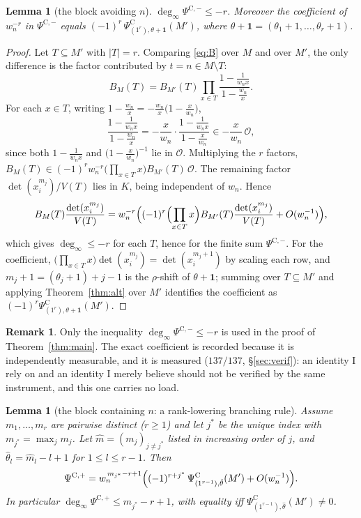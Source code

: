 \documentclass[11pt]{article}
\newtheorem{lemma}[theorem]{Lemma}
\theoremstyle{definition}
\newtheorem{remark}[theorem]{Remark}
\newcommand{\PsiC}{\Psi^{\mathrm{C}}}
\newcommand{\PsiCs}[1]{\Psi^{\mathrm{C},#1}}
\newcommand{\bone}{\mathbf{1}}
\newcommand{\degi}{\deg_{\infty}}
\begin{document}
\begin{lemma}[the block avoiding $n$]\label{lem:blockB}
$\degi\PsiCs{-}\le-r$. Moreover the coefficient of $w_n^{-r}$ in $\PsiCs{-}$ equals
$(-1)^r\,\PsiC_{(1^r),\theta+\bone}(M')$, where $\theta+\bone=(\theta_1+1,\dots,\theta_r+1)$.
\end{lemma}

\begin{proof}
Let $T\subseteq M'$ with $|T|=r$. Comparing \eqref{eq:B} over $M$ and over $M'$, the only
difference is the factor contributed by $t=n\in M\setminus T$:
\[
  B_M(T)=B_{M'}(T)\prod_{x\in T}\frac{1-\frac{1}{w_nx}}{1-\frac{w_n}{x}} .
\]
For each $x\in T$, writing $1-\frac{w_n}{x}=-\frac{w_n}{x}\bigl(1-\frac{x}{w_n}\bigr)$,
\[
  \frac{1-\frac{1}{w_nx}}{1-\frac{w_n}{x}}
  = -\frac{x}{w_n}\cdot\frac{1-\frac{1}{w_nx}}{1-\frac{x}{w_n}}
  \in -\frac{x}{w_n}\,\mathcal{O},
\]
since both $1-\frac{1}{w_nx}$ and $\bigl(1-\frac{x}{w_n}\bigr)^{-1}$ lie in $\mathcal{O}$.
Multiplying the $r$ factors,
$B_M(T)\in(-1)^rw_n^{-r}\bigl(\prod_{x\in T}x\bigr)B_{M'}(T)\,\mathcal{O}$. The remaining
factor $\det(x_i^{m_j})/V(T)$ lies in $K$, being independent of $w_n$. Hence
\[
  B_M(T)\frac{\det(x_i^{m_j})}{V(T)}
  = w_n^{-r}\Bigl((-1)^r\Bigl(\prod_{x\in T}x\Bigr)B_{M'}(T)\frac{\det(x_i^{m_j})}{V(T)}
     + O(w_n^{-1})\Bigr),
\]
which gives $\degi\le-r$ for each $T$, hence for the finite sum $\PsiCs{-}$. For the
coefficient, $\bigl(\prod_{x\in T}x\bigr)\det(x_i^{m_j})=\det(x_i^{m_j+1})$ by scaling each
row, and $m_j+1=(\theta_j+1)+j-1$ is the $\rho$-shift of $\theta+\bone$; summing over
$T\subseteq M'$ and applying Theorem~\ref{thm:alt} over $M'$ identifies the coefficient as
$(-1)^r\PsiC_{(1^r),\theta+\bone}(M')$.
\end{proof}

\begin{remark}
Only the inequality $\degi\PsiCs{-}\le-r$ is used in the proof of Theorem~\ref{thm:main}.
The exact coefficient is recorded because it is independently measurable, and it is
measured ($137/137$, \S\ref{sec:verif}): an identity I rely on and an identity I merely
believe should not be verified by the same instrument, and this one carries no load.
\end{remark}

\begin{lemma}[the block containing $n$: a rank-lowering branching rule]\label{lem:blockA}
Assume $m_1,\dots,m_r$ are pairwise distinct ($r\ge1$) and let $j^\ast$ be the unique index
with $m_{j^\ast}=\max_jm_j$. Let $\hat m=(m_j)_{j\ne j^\ast}$ listed in increasing order of
$j$, and $\hat\theta_l=\hat m_l-l+1$ for $1\le l\le r-1$. Then
\[
  \PsiCs{+}=w_n^{\,m_{j^\ast}-r+1}
   \Bigl((-1)^{r+j^\ast}\,\PsiC_{(1^{r-1}),\hat\theta}(M')+O(w_n^{-1})\Bigr).
\]
In particular $\degi\PsiCs{+}\le m_{j^\ast}-r+1$, with equality iff
$\PsiC_{(1^{r-1}),\hat\theta}(M')\ne0$.
\end{lemma}
\end{document}
